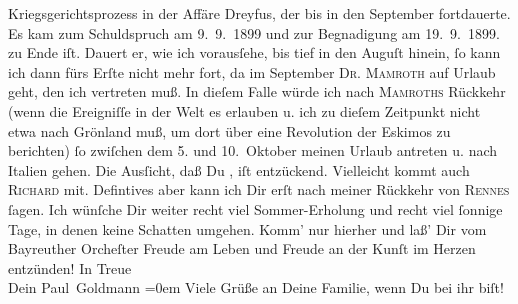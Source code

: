 \begin{ledgroupsized}[t]{13cm}
{{{                  Kriegsgerichtsprozess in der Affäre Dreyfus,
                  der bis in den September fortdauerte. Es kam zum
                  Schuldspruch am 9. 9. 1899 und zur Begnadigung am
                     19. 9. 1899.}}}\label{K_L02881-5h} zu Ende iſt. Dauert er, wie
               ich vorausſehe, bis tief in den Auguſt hinein, ſo kann
               ich dann fürs Erſte nicht mehr fort, da  im September{ }\textsc{Dr. 
                  Mamroth} auf Urlaub geht, den ich vertreten muß. In dieſem Falle würde ich nach \textsc{Mamroths} Rückkehr (wenn die Ereigniſſe
               in der Welt es erlauben u. ich zu dieſem Zeitpunkt nicht etwa nach Grönland muß, um dort über eine Revolution der Eskimos zu
               berichten) ſo zwiſchen dem 5. und 10. Oktober
               meinen Urlaub {\pb}antreten u. nach Italien gehen. Die Ausſicht, daß Du \label{K_L02881-8v}\label{K_L02881-8h}, iſt entzückend. Vielleicht kommt auch \textsc{Richard} mit. Defintives aber kann ich Dir erſt nach meiner Rückkehr von \textsc{Rennes} ſagen.\pend
           \pstart
           Ich wünſche Dir weiter recht viel Sommer-Erholung und recht viel ſonnige Tage, in
               denen keine Schatten umgehen. Komm’ nur hierher und laß’ Dir vom Bayreuther Orcheſter Freude am Leben und
               Freude an der Kunſt  im Herzen entzünden!\pend
           \pstart
           In Treue {\\[\baselineskip]}Dein \spacefill\mbox{Paul Goldmann}\pend
           \leftskip=0em{}\pstart
           \noindent{}{\pb}Viele Grüße an Deine Familie, wenn Du bei ihr
                  biſt!\pend
           
         
         \endnumbering{}\end{ledgroupsized}  \newcommand{\dateiname}{L02881}\newcommand{\titel}{Paul Goldmann an Arthur Schnitzler, 27. 7. [1899]}\newcommand{\editorInnen}{Martin Anton Müller und Laura Untner}
      